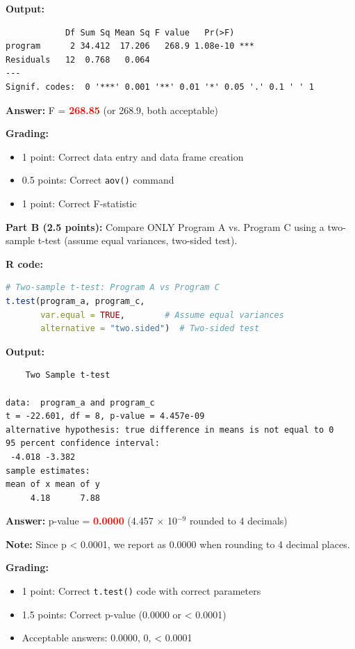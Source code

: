 \documentclass[11pt]{article}
\begin{document}
\textbf{Output:}
\begin{verbatim}
            Df Sum Sq Mean Sq F value   Pr(>F)
program      2 34.412  17.206   268.9 1.08e-10 ***
Residuals   12  0.768   0.064
---
Signif. codes:  0 '***' 0.001 '**' 0.01 '*' 0.05 '.' 0.1 ' ' 1
\end{verbatim}

\textbf{Answer:} F = \textcolor{red}{\textbf{268.85}} (or 268.9, both acceptable)

\textbf{Grading:}
\begin{itemize}
\item 1 point: Correct data entry and data frame creation
\item 0.5 points: Correct \texttt{aov()} command
\item 1 point: Correct F-statistic
\end{itemize}

\vspace{0.5cm}

\textbf{Part B (2.5 points):} Compare ONLY Program A vs. Program C using a two-sample t-test (assume equal variances, two-sided test).

\vspace{0.3cm}

\textbf{R code:}

\begin{lstlisting}[language=R,basicstyle=\small\ttfamily,frame=single]
# Two-sample t-test: Program A vs Program C
t.test(program_a, program_c,
       var.equal = TRUE,        # Assume equal variances
       alternative = "two.sided")  # Two-sided test
\end{lstlisting}

\textbf{Output:}
\begin{verbatim}
	Two Sample t-test

data:  program_a and program_c
t = -22.601, df = 8, p-value = 4.457e-09
alternative hypothesis: true difference in means is not equal to 0
95 percent confidence interval:
 -4.018 -3.382
sample estimates:
mean of x mean of y
     4.18      7.88
\end{verbatim}

\textbf{Answer:} p-value = \textcolor{red}{\textbf{0.0000}} (4.457 × 10$^{-9}$ rounded to 4 decimals)

\textbf{Note:} Since p < 0.0001, we report as 0.0000 when rounding to 4 decimal places.

\textbf{Grading:}
\begin{itemize}
\item 1 point: Correct \texttt{t.test()} code with correct parameters
\item 1.5 points: Correct p-value (0.0000 or < 0.0001)
\item Acceptable answers: 0.0000, 0, < 0.0001
\end{itemize}
\end{document}
